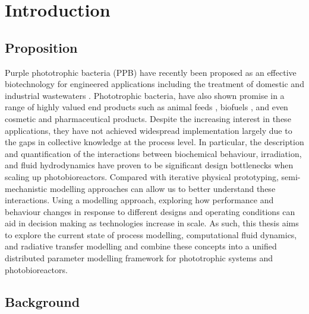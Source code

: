 \chapter[Introduction]{Introduction}
\label{chap:chap1}
\section{Proposition}
\label{sec:chap1-motivation}
Purple phototrophic bacteria (PPB) have recently been proposed as an effective biotechnology for engineered applications including the treatment of domestic \cite{hulsen2016} and industrial wastewaters \cite{hulsen2018}. Phototrophic bacteria, have also shown promise in a range of highly valued end products such as animal feeds \cite{sun2016}, biofuels \cite{adessi2014}, and even cosmetic and pharmaceutical products\cite{liu2013, Wang2018}. Despite the increasing interest in these applications, they have not achieved widespread implementation largely due to the gaps in collective knowledge at the process level. In particular, the description and quantification of the interactions between biochemical behaviour, irradiation, and fluid hydrodynamics have proven to be significant design bottlenecks when scaling up photobioreactors. 
\skippingparagraph
Compared with iterative physical prototyping, semi-mechanistic modelling approaches can allow us to better understand these interactions. Using a modelling approach, exploring how performance and behaviour changes in response to different designs and operating conditions can aid in decision making as technologies increase in scale. As such, this thesis aims to explore the current state of process modelling, computational fluid dynamics, and radiative transfer modelling and combine these concepts into a unified distributed parameter modelling framework for phototrophic systems and photobioreactors.





\newpage
\section{Background}
\label{sec:chap1-background}
